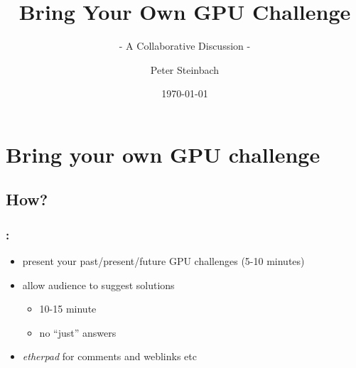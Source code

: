 \documentclass[9pt,xcolor=table]{beamer}
\begin{document}
     
 
 
\title[GPU Challenges]{Bring Your Own GPU Challenge}
\subtitle{- A Collaborative Discussion -}
\author[P. Steinbach]{Peter Steinbach}
\date{\today}
\addtocounter{framenumber}{-1}
\renewcommand*\inserttotalframenumber{22} 

 
{
\maketitle
}
 

\section[GPU challenge]{Bring your own GPU challenge}
\subsection{How?}
\begin{frame}[t]
\frametitle{\insertsectionhead{} : \insertsubsection}
\vspace{-1.5\baselineskip}
\vfill
\begin{itemize}\huge
\item present your past/present/future GPU challenges (5-10 minutes)
\item allow audience to suggest solutions
  \begin{itemize}\Large
  \item 10-15 minute 
  \item no ``just'' answers 
  \end{itemize}
\item \textit{etherpad} for comments and weblinks etc
\end{itemize}
\vfill
\end{frame}
\end{document}
